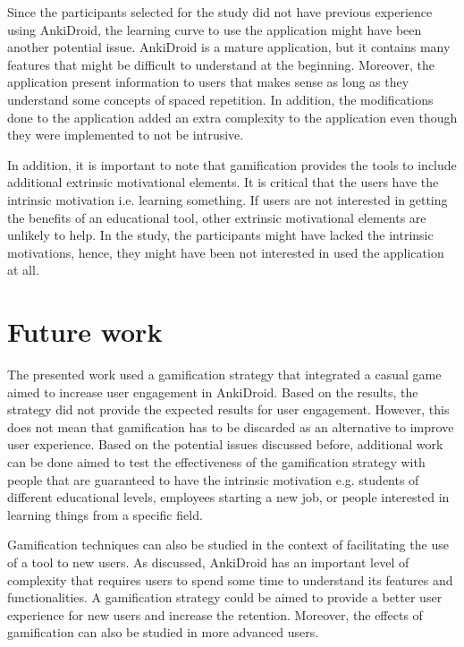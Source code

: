 Since the participants selected for the study did not have previous experience using AnkiDroid, the learning curve to use the application might have been another potential issue. AnkiDroid is a mature application, but it contains many features that might be difficult to understand at the beginning. Moreover, the application present information to users that makes sense as long as they understand some concepts of spaced repetition. In addition, the modifications done to the application added an extra complexity to the application even though they were implemented to not be intrusive.

In addition, it is important to note that gamification provides the tools to include additional extrinsic motivational elements. It is critical that the users have the intrinsic motivation i.e. learning something. If users are not interested in getting the benefits of an educational tool, other extrinsic motivational elements are unlikely to help. In the study, the participants might have lacked the intrinsic motivations, hence, they might have been not interested in used the application at all.

\section{Future work}
The presented work used a gamification strategy that integrated a casual game aimed to increase user engagement in AnkiDroid. Based on the results, the strategy did not provide the expected results for user engagement. However, this does not mean that gamification has to be discarded as an alternative to improve user experience. Based on the potential issues discussed before, additional work can be done aimed to test the effectiveness of the gamification strategy with people that are guaranteed to have the intrinsic motivation e.g. students of different educational levels, employees starting a new job, or people interested in learning things from a specific field.

Gamification techniques can also be studied in the context of facilitating the use of a tool to new users. As discussed, AnkiDroid has an important level of complexity that requires users to spend some time to understand its features and functionalities. A gamification strategy could be aimed to provide a better user experience for new users and increase the retention. Moreover, the effects of gamification can also be studied in more advanced users.